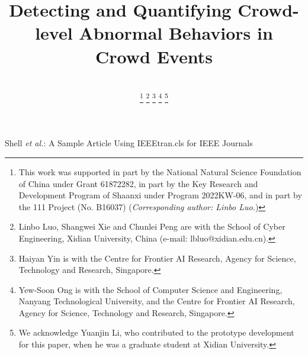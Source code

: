 \documentclass[journal]{IEEEtran}
\begin{document}
\title{Detecting and Quantifying Crowd-level Abnormal Behaviors in Crowd Events}

\author{

\\

\thanks{This work was supported in part by the National Natural Science Foundation of China under Grant 61872282, in part by the Key Research and Development Program of Shaanxi under Program 2022KW-06, and in part by the 111 Project (No. B16037) (\textit{Corresponding author: Linbo Luo.})}%
\thanks{Linbo Luo, Shangwei Xie and Chunlei Peng are with the School of Cyber Engineering, Xidian University, China (e-mail: lbluo@xidian.edu.cn).}
\thanks{Haiyan Yin is with the Centre for Frontier AI Research, Agency for Science, Technology and Research, Singapore.}
\thanks{Yew-Soon Ong is with the School of Computer Science and Engineering, Nanyang Technological University, and the Centre for Frontier AI Research, Agency for Science, Technology and Research, Singapore.}
\thanks{We acknowledge Yuanjin Li, who contributed to the prototype development for this paper, when he was a graduate student at Xidian University.}
}

%
{Shell \MakeLowercase{\textit{et al.}}: A Sample Article Using IEEEtran.cls for IEEE Journals}


\maketitle
\end{document}

